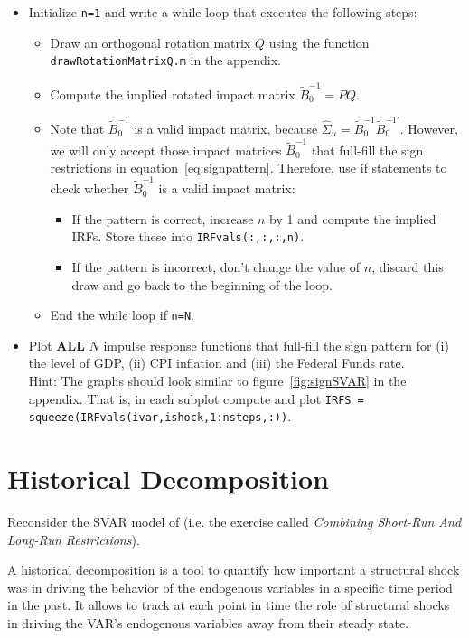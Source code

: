 \documentclass{article}
\begin{document}
\begin{enumerate}
\begin{itemize}
	\item Initialize \texttt{n=1} and write a while loop that executes the following steps:
		\begin{itemize}
		\item Draw an orthogonal rotation matrix \(Q\) using the function \texttt{drawRotationMatrixQ.m} in the appendix.
		\item Compute the implied rotated impact matrix \(\widetilde{B}_0^{-1}=PQ\).
		\item Note that \(\widetilde{B}_0^{-1}\) is a valid impact matrix, because \(\hat{\Sigma}_u = \widetilde{B}_0^{-1} \widetilde{B}_0^{-1'}\).
		However, we will only accept those impact matrices \(\widetilde{B}_0^{-1}\) that full-fill the sign restrictions in equation~\eqref{eq:signpattern}.
		Therefore, use if statements to check whether \(\widetilde{B}_0^{-1}\) is a valid impact matrix:
		\begin{itemize}
			\item If the pattern is correct, increase \(n\) by 1 and compute the implied IRFs. Store these into \texttt{IRFvals(:,:,:,n)}.
			\item If the pattern is incorrect, don't change the value of \(n\), discard this draw and go back to the beginning of the loop.
			\end{itemize}
		\item End the while loop if \texttt{n=N}.
		\end{itemize}
	\item Plot \textbf{ALL} \(N\) impulse response functions that full-fill the sign pattern for (i) the level of GDP, (ii) CPI inflation and (iii) the Federal Funds rate.
	\\Hint: The graphs should look similar to figure~\ref{fig:signSVAR} in the appendix.
	That is, in each subplot compute and plot \texttt{IRFS = squeeze(IRFvals(ivar,ishock,1:nsteps,:))}.	
	\end{itemize}
\end{enumerate}

\newpage

\section[Historical Decomposition]{Historical Decomposition}
Reconsider the SVAR model of \textcite{Rubio-Ramirez.Waggoner.Zha_2010_StructuralVectorAutoregressions}
(i.e. the exercise called \emph{Combining Short-Run And Long-Run Restrictions}).

A historical decomposition is a tool to quantify how important a structural shock was 
in driving the behavior of the endogenous variables in a specific time period in the past.
It allows to track at each point in time the role of structural shocks
in driving the VAR's endogenous variables away from their steady state.
\end{document}
